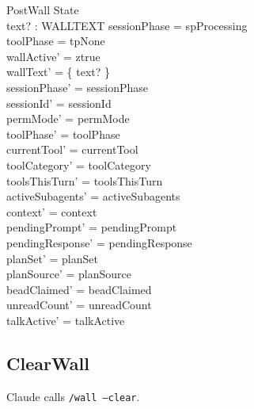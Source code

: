 \documentclass[a4paper,10pt,fleqn]{article}
\begin{document}
\begin{schema}{PostWall}
  \Delta State \\
  text? : WALLTEXT
  \where
  sessionPhase = spProcessing \\
  toolPhase = tpNone \\
  wallActive' = ztrue \\
  wallText' = \{ text? \} \\
  sessionPhase' = sessionPhase \\
  sessionId' = sessionId \\
  permMode' = permMode \\
  toolPhase' = toolPhase \\
  currentTool' = currentTool \\
  toolCategory' = toolCategory \\
  toolsThisTurn' = toolsThisTurn \\
  activeSubagents' = activeSubagents \\
  context' = context \\
  pendingPrompt' = pendingPrompt \\
  pendingResponse' = pendingResponse \\
  planSet' = planSet \\
  planSource' = planSource \\
  beadClaimed' = beadClaimed \\
  unreadCount' = unreadCount \\
  talkActive' = talkActive
\end{schema}

\subsection{ClearWall}

Claude calls \texttt{/wall --clear}.
\end{document}
